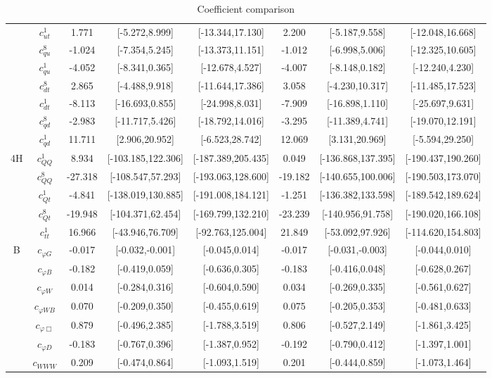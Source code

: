 \documentclass{article}
\begin{document}
\begin{table}[H]
\begin{tabular}{|c|c|c|c|c|c|c|c|}
 & $c_{ut}^{1}$ & 1.771 & [-5.272,8.999] & [-13.344,17.130]  & 2.200 & [-5.187,9.558] & [-12.048,16.668]  \\ \cline{2-8}
 & $c_{qu}^{8}$ & -1.024 & [-7.354,5.245] & [-13.373,11.151]  & -1.012 & [-6.998,5.006] & [-12.325,10.605]  \\ \cline{2-8}
 & $c_{qu}^{1}$ & -4.052 & [-8.341,0.365] & [-12.678,4.527]  & -4.007 & [-8.148,0.182] & [-12.240,4.230]  \\ \cline{2-8}
 & $c_{dt}^{8}$ & 2.865 & [-4.488,9.918] & [-11.644,17.386]  & 3.058 & [-4.230,10.317] & [-11.485,17.523]  \\ \cline{2-8}
 & $c_{dt}^{1}$ & -8.113 & [-16.693,0.855] & [-24.998,8.031]  & -7.909 & [-16.898,1.110] & [-25.697,9.631]  \\ \cline{2-8}
 & $c_{qd}^{8}$ & -2.983 & [-11.717,5.426] & [-18.792,14.016]  & -3.295 & [-11.389,4.741] & [-19.070,12.191]  \\ \cline{2-8}
 & $c_{qd}^{1}$ & 11.711 & [2.906,20.952] & [-6.523,28.742]  & 12.069 & [3.131,20.969] & [-5.594,29.250]  \\ \cline{2-8}
\hline
\multirow{5}{*}{4H}
 & $c_{QQ}^{1}$ & 8.934 & [-103.185,122.306] & [-187.389,205.435]  & 0.049 & [-136.868,137.395] & [-190.437,190.260]  \\ \cline{2-8}
 & $c_{QQ}^{8}$ & -27.318 & [-108.547,57.293] & [-193.063,128.600]  & -19.182 & [-140.655,100.006] & [-190.503,173.070]  \\ \cline{2-8}
 & $c_{Qt}^{1}$ & -4.841 & [-138.019,130.885] & [-191.008,184.121]  & -1.251 & [-136.382,133.598] & [-189.542,189.624]  \\ \cline{2-8}
 & $c_{Qt}^{8}$ & -19.948 & [-104.371,62.454] & [-169.799,132.210]  & -23.239 & [-140.956,91.758] & [-190.020,166.108]  \\ \cline{2-8}
 & $c_{tt}^{1}$ & 16.966 & [-43.946,76.709] & [-92.763,125.004]  & 21.849 & [-53.092,97.926] & [-114.620,154.803]  \\ \cline{2-8}
\hline
\multirow{7}{*}{B}
 & $c_{\varphi G}$ & -0.017 & [-0.032,-0.001] & [-0.045,0.014]  & -0.017 & [-0.031,-0.003] & [-0.044,0.010]  \\ \cline{2-8}
 & $c_{\varphi B}$ & -0.182 & [-0.419,0.059] & [-0.636,0.305]  & -0.183 & [-0.416,0.048] & [-0.628,0.267]  \\ \cline{2-8}
 & $c_{\varphi W}$ & 0.014 & [-0.284,0.316] & [-0.604,0.590]  & 0.034 & [-0.269,0.335] & [-0.561,0.627]  \\ \cline{2-8}
 & $c_{\varphi WB}$ & 0.070 & [-0.209,0.350] & [-0.455,0.619]  & 0.075 & [-0.205,0.353] & [-0.481,0.633]  \\ \cline{2-8}
 & $c_{\varphi \Box}$ & 0.879 & [-0.496,2.385] & [-1.788,3.519]  & 0.806 & [-0.527,2.149] & [-1.861,3.425]  \\ \cline{2-8}
 & $c_{\varphi D}$ & -0.183 & [-0.767,0.396] & [-1.387,0.952]  & -0.192 & [-0.790,0.412] & [-1.397,1.001]  \\ \cline{2-8}
 & $c_{WWW}$ & 0.209 & [-0.474,0.864] & [-1.093,1.519]  & 0.201 & [-0.444,0.859] & [-1.073,1.464]  \\ \cline{2-8}
\hline
\end{tabular}
\caption{Coefficient comparison}
\end{table}
\end{document}
